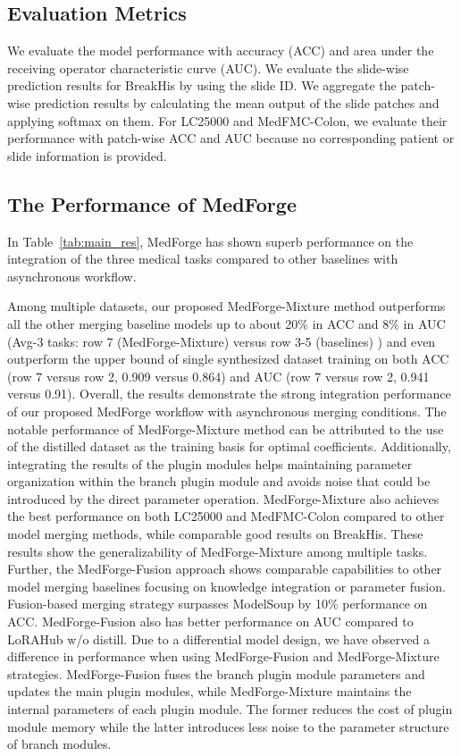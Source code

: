 \subsection{Evaluation Metrics}
We evaluate the model performance with accuracy (ACC) and area under the receiving operator characteristic curve (AUC). We evaluate the slide-wise prediction results for BreakHis by using the slide ID. We aggregate the patch-wise prediction results by calculating the mean output of the slide patches and applying softmax on them. For LC25000 and MedFMC-Colon, we evaluate their performance with patch-wise ACC and AUC because no corresponding patient or slide information is provided.


\subsection{The Performance of MedForge}
In Table~\ref{tab:main_res}, MedForge has shown superb performance on the integration of the three medical tasks compared to other baselines with asynchronous workflow.

Among multiple datasets, our proposed MedForge-Mixture method outperforms all the other merging baseline models up to about 20\% in ACC and 8\% in AUC (Avg-3 tasks: row 7 (MedForge-Mixture) versus row 3-5 (baselines) ) and even outperform the upper bound of single synthesized dataset training on both ACC (row 7 versus row 2, 0.909 versus 0.864) and AUC (row 7 versus row 2, 0.941 versus 0.91).
Overall, the results demonstrate the strong integration performance of our proposed MedForge workflow with asynchronous merging conditions.
The notable performance of MedForge-Mixture method can be attributed to the use of the distilled dataset as the training basis for optimal coefficients. Additionally, integrating the results of the plugin modules helps maintaining parameter organization within the branch plugin module and avoids noise that could be introduced by the direct parameter operation. MedForge-Mixture also achieves the best performance on both LC25000 and MedFMC-Colon compared to other model merging methods, while comparable good results on BreakHis. These results show the generalizability of MedForge-Mixture among multiple tasks.
Further, the MedForge-Fusion approach shows comparable capabilities to other model merging baselines focusing on knowledge integration or parameter fusion. Fusion-based merging strategy surpasses ModelSoup by 10\% performance on ACC. MedForge-Fusion also has better performance on AUC compared to LoRAHub w/o distill. 
Due to a differential model design, we have observed a difference in performance when using MedForge-Fusion and MedForge-Mixture strategies. MedForge-Fusion fuses the branch plugin module parameters and updates the main plugin modules, while MedForge-Mixture maintains the internal parameters of each plugin module. The former reduces the cost of plugin module memory while the latter introduces less noise to the parameter structure of branch modules.








